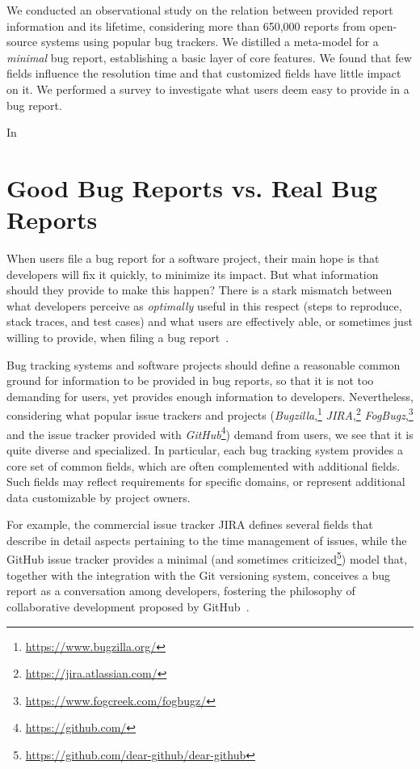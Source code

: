 We conducted an observational study on the relation between provided report information and its lifetime, considering more than 650,000 reports from open-source systems using popular bug trackers.
We distilled a meta-model for a \emph{minimal} bug report, establishing a basic layer of core features.
We found that few fields influence the resolution time and that customized fields have little impact on it.
We performed a survey to investigate what users deem easy to provide in a bug report.

\structure
In
\newpage


\section{Good Bug Reports vs. Real Bug Reports}

When users file a bug report for a software project, their main hope is that developers will fix it quickly, to minimize its impact.
But what information should they provide to make this happen? There is a stark mismatch between what developers perceive as \emph{optimally} useful in this respect (\ie steps to reproduce, stack traces, and test cases) and what users are effectively able, or sometimes just willing to provide, when filing a bug report~\cite{Zimm2010a}.

Bug tracking systems and software projects should define a reasonable common ground for information to be provided in bug reports, so that it is not too demanding for users, yet provides enough information to developers.
Nevertheless, considering what popular issue trackers and projects (\eg \emph{Bugzilla},\footnote{\url{https://www.bugzilla.org/}} \emph{JIRA},\footnote{\url{https://jira.atlassian.com/}} \emph{FogBugz},\footnote{\url{https://www.fogcreek.com/fogbugz/}} and the issue tracker provided with \emph{GitHub}\footnote{\url{https://github.com/}}) demand from users, we see that it is quite diverse and specialized.
In particular, each bug tracking system provides a core set of common fields, which are often complemented with additional fields.
Such  fields may reflect requirements for specific domains, or represent additional data customizable by project owners.

For example, the commercial issue tracker JIRA defines several fields that describe in detail aspects pertaining to the time management of issues, while the GitHub issue tracker provides a minimal (and sometimes criticized\footnote{\url{https://github.com/dear-github/dear-github}}) model that, together with the integration with the Git versioning system, conceives a bug report as a conversation among developers, fostering the philosophy of collaborative development proposed by GitHub~\cite{Thun2013}.

